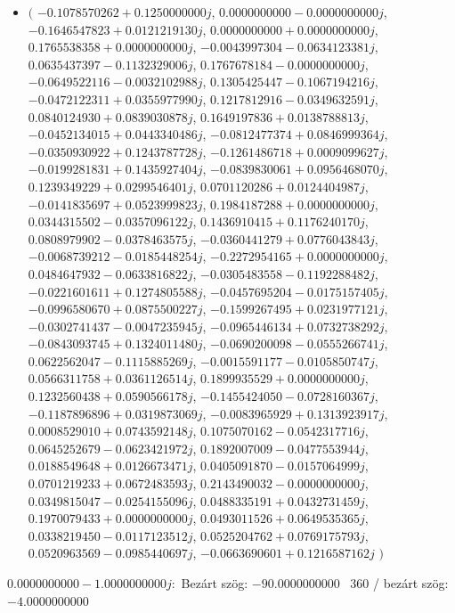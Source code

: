 \documentclass[14pt,a4paper]{article}
\begin{document}
\begin{itemize}
\item
$\big($
$-0.1078570262+0.1250000000j$, $0.0000000000-0.0000000000j$, $-0.1646547823+0.0121219130j$, $0.0000000000+0.0000000000j$, $0.1765538358+0.0000000000j$, $-0.0043997304-0.0634123381j$, $0.0635437397-0.1132329006j$, $0.1767678184-0.0000000000j$, $-0.0649522116-0.0032102988j$, $0.1305425447-0.1067194216j$, $-0.0472122311+0.0355977990j$, $0.1217812916-0.0349632591j$, $0.0840124930+0.0839030878j$, $0.1649197836+0.0138788813j$, $-0.0452134015+0.0443340486j$, $-0.0812477374+0.0846999364j$, $-0.0350930922+0.1243787728j$, $-0.1261486718+0.0009099627j$, $-0.0199281831+0.1435927404j$, $-0.0839830061+0.0956468070j$, $0.1239349229+0.0299546401j$, $0.0701120286+0.0124404987j$, $-0.0141835697+0.0523999823j$, $0.1984187288+0.0000000000j$, $0.0344315502-0.0357096122j$, $0.1436910415+0.1176240170j$, $0.0808979902-0.0378463575j$, $-0.0360441279+0.0776043843j$, $-0.0068739212-0.0185448254j$, $-0.2272954165+0.0000000000j$, $0.0484647932-0.0633816822j$, $-0.0305483558-0.1192288482j$, $-0.0221601611+0.1274805588j$, $-0.0457695204-0.0175157405j$, $-0.0996580670+0.0875500227j$, $-0.1599267495+0.0231977121j$, $-0.0302741437-0.0047235945j$, $-0.0965446134+0.0732738292j$, $-0.0843093745+0.1324011480j$, $-0.0690200098-0.0555266741j$, $0.0622562047-0.1115885269j$, $-0.0015591177-0.0105850747j$, $0.0566311758+0.0361126514j$, $0.1899935529+0.0000000000j$, $0.1232560438+0.0590566178j$, $-0.1455424050-0.0728160367j$, $-0.1187896896+0.0319873069j$, $-0.0083965929+0.1313923917j$, $0.0008529010+0.0743592148j$, $0.1075070162-0.0542317716j$, $0.0645252679-0.0623421972j$, $0.1892007009-0.0477553944j$, $0.0188549648+0.0126673471j$, $0.0405091870-0.0157064999j$, $0.0701219233+0.0672483593j$, $0.2143490032-0.0000000000j$, $0.0349815047-0.0254155096j$, $0.0488335191+0.0432731459j$, $0.1970079433+0.0000000000j$, $0.0493011526+0.0649535365j$, $0.0338219450-0.0117123512j$, $0.0525204762+0.0769175793j$, $0.0520963569-0.0985440697j$, $-0.0663690601+0.1216587162j$
$\big)$
\end{itemize}
$0.0000000000-1.0000000000j$:\
Bezárt szög: $-90.0000000000$ \
360 / bezárt szög: $-4.0000000000$\
\end{document}
